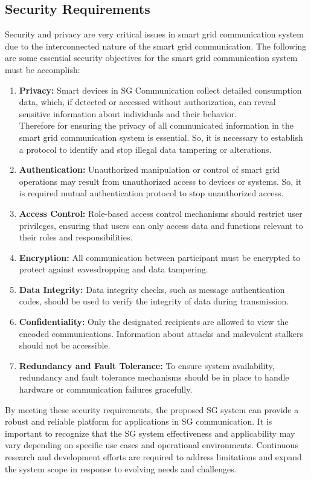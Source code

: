 \documentclass[3p,times,onecolumn]{elsarticle}
\begin{document}
\subsection{Security Requirements}
Security and privacy are very critical issues in smart grid communication system due to the interconnected nature of the smart grid communication.
The following are some essential security objectives for the smart grid communication system must be accomplish:
\begin{enumerate}
\item \textbf{Privacy:} Smart devices in SG Communication collect detailed consumption data, which, if detected or accessed without authorization, can reveal sensitive information about individuals and their behavior.\\
Therefore for ensuring the privacy of all communicated information in the smart grid communication system is essential. So, it is necessary to establish a protocol  to identify and stop illegal data tampering or alterations.
\item \textbf{Authentication:} 
Unauthorized manipulation or control of smart grid operations may result from unauthorized access to devices or systems.
So, it is required mutual authentication protocol to stop unauthorized access.
\item \textbf{Access Control:} Role-based access control mechanisms should restrict user privileges, ensuring that users can only access data and functions relevant to their roles and responsibilities.
\item \textbf{Encryption:} All communication between participant must be encrypted to protect against eavesdropping and data tampering. 
\item \textbf{Data Integrity:} Data integrity checks, such as message authentication codes, should be used to verify the integrity of data during transmission.
\item \textbf{Confidentiality:} Only the designated recipients are allowed to view the encoded communications. Information about attacks and malevolent stalkers should not be accessible.
\item \textbf{Redundancy and Fault Tolerance:} To ensure system availability, redundancy and fault tolerance mechanisms should be in place to handle hardware or communication failures gracefully.
\end{enumerate}
By meeting these security requirements, the proposed SG system can provide a robust and reliable platform for applications in SG communication.
It is important to recognize that the SG system effectiveness and applicability may vary depending on specific use cases and operational environments. Continuous research and development efforts are required to address limitations and expand the system scope in response to evolving needs and challenges.
\end{document}
